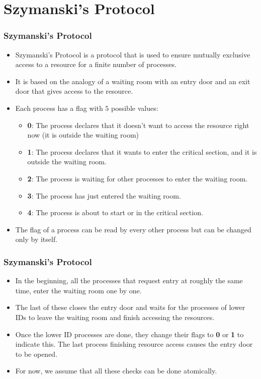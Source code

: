\documentclass{beamer}
\begin{document}
    \section{Szymanski's Protocol}
    {
        \begin{frame}
            \frametitle{Szymanski's Protocol}
            \begin{itemize}
                \item Szymanski's Protocol is a protocol that is used to ensure mutually exclusive access to a resource for a finite number of processes.
                \item It is based on the analogy of a waiting room with an entry door and an exit door that gives access to the resource.
                \item Each process has a flag with $5$ possible values:
                \begin{itemize}
                    \item \textbf{0}: The process declares that it doesn't want to access the resource right now (it is outside the waiting room)
                    \item \textbf{1}: The process declares that it wants to enter the critical section, and it is outside the waiting room.
                    \item \textbf{2}: The process is waiting for other processes to enter the waiting room.
                    \item \textbf{3}: The process has just entered the waiting room.
                    \item \textbf{4}: The process is about to start or in the critical section.
                \end{itemize}
                \item The flag of a process can be read by every other process but can be changed only by itself.
            \end{itemize}            
        \end{frame}

        \begin{frame}
            \frametitle{Szymanski's Protocol}
            \begin{itemize}
                \item In the beginning, all the processes that request entry at roughly the same time, enter the waiting room one by one. 
                \item The last of these closes the entry door and waits for the processes of lower IDs to leave the waiting room and finish accessing the resources.
                \item Once the lower ID processes are done, they change their flags to \textbf{0} or \textbf{1} to indicate this. The last process finishing resource access causes the entry door to be opened.
                \item For now, we assume that all these checks can be done atomically.
            \end{itemize}
        \end{frame}

}
\end{document}
